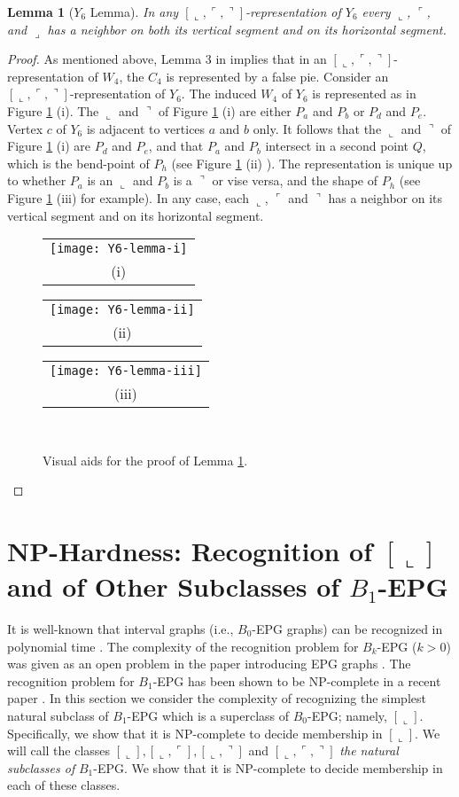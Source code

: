 \documentclass[11pt,3p,times]{elsarticle}
\newenvironment{myproof}{\begin{proof}}{\end{proof}}
\newcommand{\La}{\ensuremath{\llcorner}} \newcommand{\Lb}{\ensuremath{\ulcorner}} \newcommand{\Lc}{\ensuremath{\lrcorner}} \newcommand{\Ld}{\ensuremath{\urcorner}}
\newtheorem{lemma}[theorem]{Lemma}
\begin{document}
\begin{lemma}[$Y_6$ Lemma]\label{lem:Y6}
In any $[\La,\Lb,\Ld]$-representation of $Y_6$ every $\La$, $\Lb$, and $\Lc$ has a neighbor on both its vertical segment and on its horizontal segment.
\end{lemma}
\begin{myproof}
As mentioned above, Lemma 3 in
\cite{Asi2012} implies that in an $[\La,\Lb,\Ld]$-representation of $W_4$, the
$C_4$ is represented by a false pie. Consider an $[\La,\Lb,\Ld]$-representation of $Y_6$.
The induced $W_4$ of $Y_6$ is represented as in Figure
\ref{fig:Y6Proof}
(i). The $\La$ and $\Ld$ of Figure 
\ref{fig:Y6Proof}
(i) are either $P_a$ and $P_b$ or $P_d$ and $P_e$. Vertex $c$ of $Y_6$ is adjacent to vertices $a$ and $b$ only.
It follows that the $\La$ and $\Ld$ of Figure
\ref{fig:Y6Proof}
(i) are $P_d$ and $P_e$, and that $P_a$ and $P_b$ intersect in a second point $Q$, which is the bend-point of $P_h$
(see Figure
\ref{fig:Y6Proof}
(ii) ). The representation is unique up to whether $P_a$ is an $\La$ and $P_b$ is a $\Ld$ or vise versa,
and the shape of $P_h$ (see Figure
\ref{fig:Y6Proof}
(iii) for example). In any case, each $\La$, $\Lb$ and $\Ld$ has a neighbor on its vertical segment
and on its horizontal segment.

\begin{figure}[h]
\hfill
\begin{tabular}{c}
\texttt{[image: Y6-lemma-i]}\\
(i)
\end{tabular}
\hfill
\begin{tabular}{c}
\texttt{[image: Y6-lemma-ii]}\\
(ii)
\end{tabular}
\hfill
\begin{tabular}{c}
\texttt{[image: Y6-lemma-iii]}\\
(iii)
\end{tabular}
\hfill \
\caption{Visual aids for the proof of Lemma \ref{lem:Y6}.}
\label{fig:Y6Proof}
\end{figure}
\end{myproof}

\section{NP-Hardness: Recognition of $[\La]$ and of Other Subclasses of $B_1$-EPG }
\label{sec:np-hard}

It is well-known that interval graphs (i.e., $B_0$-EPG graphs) can
be recognized in polynomial time \cite{Boo1976}. The complexity of
the recognition problem for $B_k$-EPG ($k > 0$) was given as an
open problem in the paper introducing EPG graphs \cite{Gol2009}.
The recognition problem for $B_1$-EPG has been shown to be
NP-complete in a recent paper \cite{Hel2010}. In this section we
consider the complexity of recognizing the simplest natural
subclass of $B_1$-EPG which is a superclass of $B_0$-EPG; namely,
$[\La]$. Specifically, we show that it is NP-complete to decide
membership in $[\La]$. We will call the classes $[\La],
[\La,\Lb],[\La,\Ld]$ and $[\La,\Lb,\Ld]$ \textit{the natural
subclasses of} $B_1$-EPG. We show that it is NP-complete to
decide membership in each of these classes.
\end{document}
